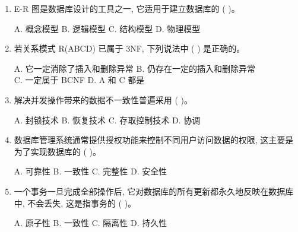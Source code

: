 \documentclass{ctexart} %
\begin{document}
\begin{enumerate}[label=\arabic*.]
\begin{flushleft}
    A. BCD \hspace{2cm} B. BC \hspace{2cm} C. ABC \hspace{2cm} D. C
    \end{flushleft}
    \item E-R 图是数据库设计的工具之一, 它适用于建立数据库的 ( )。
    \begin{flushleft}
    A. 概念模型 \hspace{2cm} B. 逻辑模型 \hspace{2cm} C. 结构模型 \hspace{2cm} D. 物理模型
    \end{flushleft}
    \item 若关系模式 R(ABCD) 已属于 3NF, 下列说法中 ( ) 是正确的。 %
    \begin{flushleft}
    A. 它一定消除了插入和删除异常 \hspace{2cm} B. 仍存在一定的插入和删除异常 \\
    C. 一定属于 BCNF \hspace{2cm} D. A 和 C 都是
    \end{flushleft}
    \item 解决并发操作带来的数据不一致性普遍采用 ( )。
    \begin{flushleft}
    A. 封锁技术 \hspace{2cm} B. 恢复技术 \hspace{2cm} C. 存取控制技术 \hspace{2cm} D. 协调
    \end{flushleft}
    \item 数据库管理系统通常提供授权功能来控制不同用户访问数据的权限, 这主要是为了实现数据库的 ( )。
    \begin{flushleft}
    A. 可靠性 \hspace{2cm} B. 一致性 \hspace{2cm} C. 完整性 \hspace{2cm} D. 安全性
    \end{flushleft}
    \item 一个事务一旦完成全部操作后, 它对数据库的所有更新都永久地反映在数据库中, 不会丢失, 这是指事务的 ( )。
    \begin{flushleft}
    A. 原子性 \hspace{2cm} B. 一致性 \hspace{2cm} C. 隔离性 \hspace{2cm} D. 持久性
    \end{flushleft}

\end{enumerate}
\end{document}
